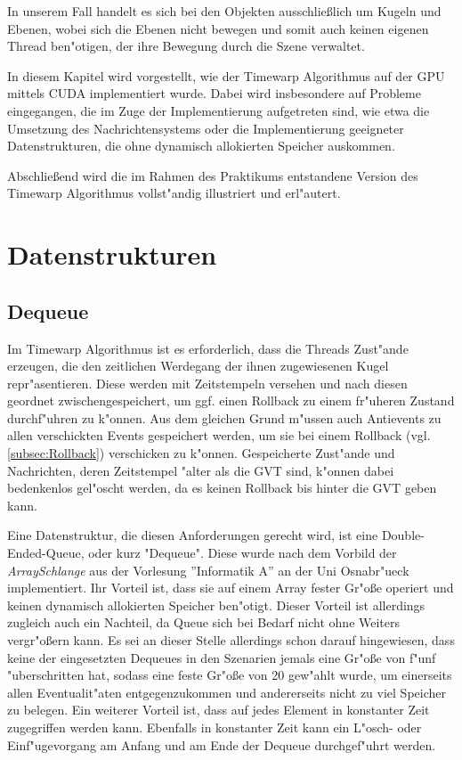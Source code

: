 \documentclass[a4paper, 10pt, openright, parskip, chapterprefix]{scrreprt}
\begin{document}
In unserem Fall handelt es sich bei den Objekten ausschlie\ss lich um Kugeln und Ebenen, wobei sich die Ebenen nicht
bewegen und somit auch keinen eigenen Thread ben"otigen, der ihre Bewegung durch die Szene verwaltet.

In diesem Kapitel wird vorgestellt, wie der Timewarp Algorithmus auf der GPU mittels CUDA implementiert wurde. Dabei wird
insbesondere auf Probleme eingegangen, die im Zuge der Implementierung aufgetreten sind, wie etwa die Umsetzung des
Nachrichtensystems oder die Implementierung geeigneter Datenstrukturen, die ohne dynamisch allokierten Speicher
auskommen.

Abschlie\ss end wird die im Rahmen des Praktikums entstandene Version des Timewarp Algorithmus vollst"andig illustriert
und erl"autert.

\section{Datenstrukturen}
\subsection{Dequeue}
Im Timewarp Algorithmus ist es erforderlich, dass die Threads Zust"ande erzeugen, die den zeitlichen Werdegang der ihnen zugewiesenen
Kugel repr"asentieren. Diese werden mit Zeitstempeln versehen und nach diesen geordnet zwischengespeichert, um ggf. einen Rollback zu einem
fr"uheren Zustand durchf"uhren zu k"onnen. Aus dem gleichen Grund m"ussen auch Antievents zu allen verschickten Events gespeichert
werden, um sie bei einem Rollback (vgl. \ref{subsec:Rollback}) verschicken zu k"onnen.
Gespeicherte Zust"ande und Nachrichten, deren Zeitstempel "alter als die GVT sind, k"onnen dabei bedenkenlos gel"oscht
werden, da es keinen Rollback bis hinter die GVT geben kann.

Eine Datenstruktur, die diesen Anforderungen gerecht wird, ist eine Double-Ended-Queue, oder kurz "Dequeue". Diese wurde
nach dem Vorbild der \emph{ArraySchlange} aus der Vorlesung ''Informatik A'' \cite{...} an der Uni Osnabr"ueck
implementiert. Ihr Vorteil ist, dass sie auf einem Array fester Gr"o\ss e operiert und keinen dynamisch allokierten
Speicher ben"otigt. Dieser Vorteil ist allerdings zugleich auch ein Nachteil, da Queue sich bei Bedarf nicht ohne
Weiters vergr"o\ss ern kann. Es sei an dieser Stelle allerdings schon darauf hingewiesen, dass keine der eingesetzten
Dequeues in den Szenarien jemals eine Gr"o\ss e von f"unf "uberschritten hat, sodass eine feste Gr"o\ss e von 20
gew"ahlt wurde, um einerseits allen Eventualit"aten entgegenzukommen und andererseits nicht zu viel Speicher zu belegen.
Ein weiterer Vorteil ist, dass auf jedes Element in konstanter Zeit zugegriffen werden kann. Ebenfalls in konstanter
Zeit kann ein L"osch- oder Einf"ugevorgang am Anfang und am Ende der Dequeue durchgef"uhrt werden.
\end{document}
